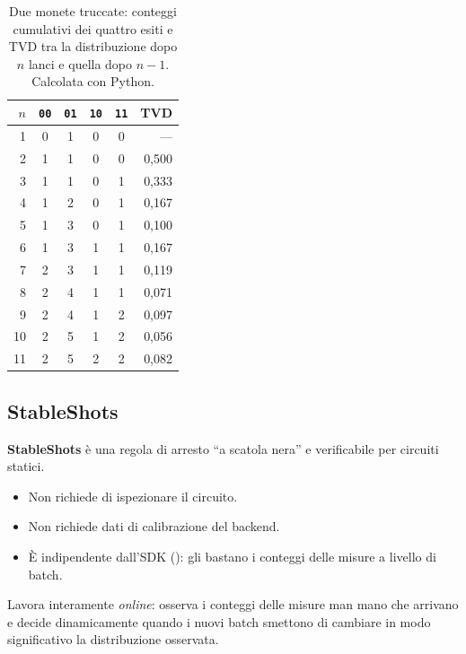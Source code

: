 \begin{table}[ht]
\centering
\small
\caption{Due monete truccate: conteggi cumulativi dei quattro esiti e TVD tra la distribuzione dopo $n$ lanci e quella
dopo $n-1$. Calcolata con Python.\aggiunta}
\label{tab:qse-monete}
\begin{tabular}{rccccr}
\toprule
$n$ & \texttt{00} & \texttt{01} & \texttt{10} & \texttt{11} & TVD \\
\midrule
1 & 0 & 1 & 0 & 0 & --- \\
2 & 1 & 1 & 0 & 0 & 0,500 \\
3 & 1 & 1 & 0 & 1 & 0,333 \\
4 & 1 & 2 & 0 & 1 & 0,167 \\
5 & 1 & 3 & 0 & 1 & 0,100 \\
6 & 1 & 3 & 1 & 1 & 0,167 \\
7 & 2 & 3 & 1 & 1 & 0,119 \\
8 & 2 & 4 & 1 & 1 & 0,071 \\
9 & 2 & 4 & 1 & 2 & 0,097 \\
10 & 2 & 5 & 1 & 2 & 0,056 \\
11 & 2 & 5 & 2 & 2 & 0,082 \\
\bottomrule
\end{tabular}
\end{table}

\subsection{StableShots}

\textbf{StableShots} è una regola di arresto ``a scatola nera'' e verificabile per circuiti statici.
\begin{itemize}
  \item Non richiede di ispezionare il circuito.
  \item Non richiede dati di calibrazione del backend.
  \item È indipendente dall'SDK (): gli bastano i conteggi delle misure a livello di batch.
\end{itemize}
Lavora interamente \emph{online}: osserva i conteggi delle misure man mano che arrivano e decide dinamicamente quando i
nuovi batch smettono di cambiare in modo significativo la distribuzione osservata.

